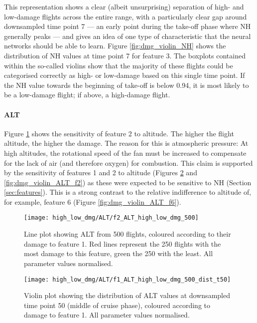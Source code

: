 This representation shows a clear (albeit unsurprising) separation of high- and low-damage flights across the entire range, with a particularly clear gap around downsampled time point 7 --- an early point during the take-off phase where NH generally peaks --- and gives an idea of one type of characteristic that the neural networks should be able to learn. Figure \ref{fig:dmg_violin_NH} shows the distribution of NH values at time point 7 for feature 3. The boxplots contained within the so-called violins show that the majority of these flights could be categorised correctly as high- or low-damage based on this single time point. If the NH value towards the beginning of take-off is below 0.94, it is most likely to be a low-damage flight; if above, a high-damage flight.

\paragraph{ALT}
Figure \ref{fig:high_low_dmg_ALT} shows the sensitivity of feature 2 to altitude. The higher the flight altitude, the higher the damage. The reason for this is atmospheric pressure: At high altitudes, the rotational speed of the fan must be increased to compensate for the lack of air (and therefore oxygen) for combustion. This claim is supported by the sensitivity of features 1 and 2 to altitude (Figures \ref{fig:dmg_violin_ALT_f1} and \ref{fig:dmg_violin_ALT_f2}) as these were expected to be sensitive to NH (Section \ref{sec:features}). This is a strong contrast to the relative indifference to altitude of, for example, feature 6 (Figure \ref{fig:dmg_violin_ALT_f6}).

\begin{figure}
    \centering
    \texttt{[image: high\_low\_dmg/ALT/f2\_ALT\_high\_low\_dmg\_500]}
    \caption{\label{fig:high_low_dmg_ALT} Line plot showing ALT from 500 flights, coloured according to their damage to feature 1. Red lines represent the 250 flights with the most damage to this feature, green the 250 with the least. All parameter values normalised.}
\end{figure}

\begin{figure}
    \centering
    \texttt{[image: high\_low\_dmg/ALT/f1\_ALT\_high\_low\_dmg\_500\_dist\_t50]}
    \caption{\label{fig:dmg_violin_ALT_f1} Violin plot showing the distribution of ALT values at downsampled time point 50 (middle of cruise phase), coloured according to damage to feature 1. All parameter values normalised.}
\end{figure}

